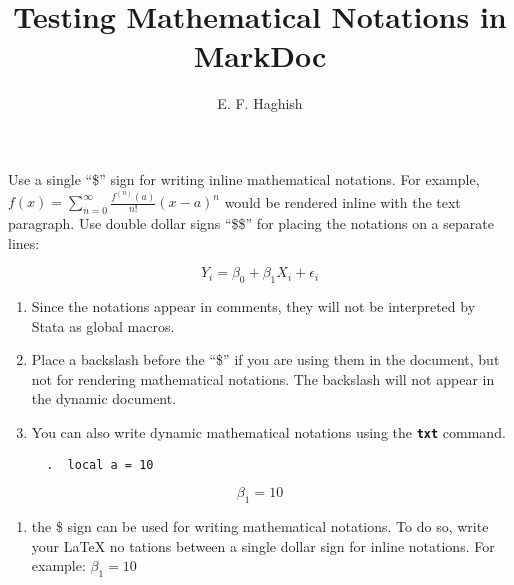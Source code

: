 \documentclass{article}
\begin{document}
\title{Testing Mathematical Notations in MarkDoc}
\author{E. F. Haghish } 
\maketitle


Use a single ``\$'' sign for writing inline mathematical notations. For
example, \(f(x)=\sum_{n=0}^\infty\frac{f^{(n)}(a)}{n!}(x-a)^n\) would be
rendered inline with the text paragraph. Use double dollar signs
``\$\$'' for placing the notations on a separate lines:

\[Y_i = \beta_0 + \beta_1 X_i + \epsilon_i\]

\begin{enumerate}
\def\labelenumi{\arabic{enumi}.}
\item
  Since the notations appear in comments, they will not be interpreted
  by Stata as global macros.
\item
  Place a backslash before the ``\$'' if you are using them in the
  document, but not for rendering mathematical notations. The backslash
  will not appear in the dynamic document.
\item
  You can also write dynamic mathematical notations using the
  \textbf{\texttt{txt}} command.

\begin{verbatim}
  .  local a = 10
\end{verbatim}
\end{enumerate}

\[ \beta_1 = 10 \]

\begin{enumerate}
\def\labelenumi{\arabic{enumi}.}
\setcounter{enumi}{4}
\tightlist
\item
  the \$ sign can be used for writing mathematical notations. To do so,
  write your LaTeX no tations between a single dollar sign for inline
  notations. For example: \(\beta_1 = 10\)
\end{enumerate}
\end{document}
